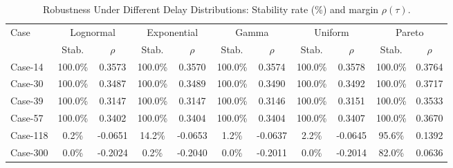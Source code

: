 \begin{table}[t]
\centering
\caption{Robustness Under Different Delay Distributions: Stability rate (\%) and margin $\rho(\tau)$.}
\label{tab:delay_dist}
\begin{tabular}{lcccccccccc}
\toprule
Case & \multicolumn{2}{c}{Lognormal} & \multicolumn{2}{c}{Exponential} & \multicolumn{2}{c}{Gamma} & \multicolumn{2}{c}{Uniform} & \multicolumn{2}{c}{Pareto} \\
\cmidrule(lr){2-3}\cmidrule(lr){4-5}\cmidrule(lr){6-7}\cmidrule(lr){8-9}\cmidrule(lr){10-11}
 & Stab. & $\rho$ & Stab. & $\rho$ & Stab. & $\rho$ & Stab. & $\rho$ & Stab. & $\rho$ \\
\midrule
Case-14 & 100.0\% & 0.3573 & 100.0\% & 0.3570 & 100.0\% & 0.3574 & 100.0\% & 0.3578 & 100.0\% & 0.3764 \\
Case-30 & 100.0\% & 0.3487 & 100.0\% & 0.3489 & 100.0\% & 0.3490 & 100.0\% & 0.3492 & 100.0\% & 0.3717 \\
Case-39 & 100.0\% & 0.3147 & 100.0\% & 0.3147 & 100.0\% & 0.3146 & 100.0\% & 0.3151 & 100.0\% & 0.3533 \\
Case-57 & 100.0\% & 0.3402 & 100.0\% & 0.3404 & 100.0\% & 0.3404 & 100.0\% & 0.3407 & 100.0\% & 0.3670 \\
Case-118 & 0.2\% & -0.0651 & 14.2\% & -0.0653 & 1.2\% & -0.0637 & 2.2\% & -0.0645 & 95.6\% & 0.1392 \\
Case-300 & 0.0\% & -0.2024 & 0.2\% & -0.2040 & 0.0\% & -0.2011 & 0.0\% & -0.2014 & 82.0\% & 0.0636 \\
\bottomrule
\end{tabular}
\end{table}